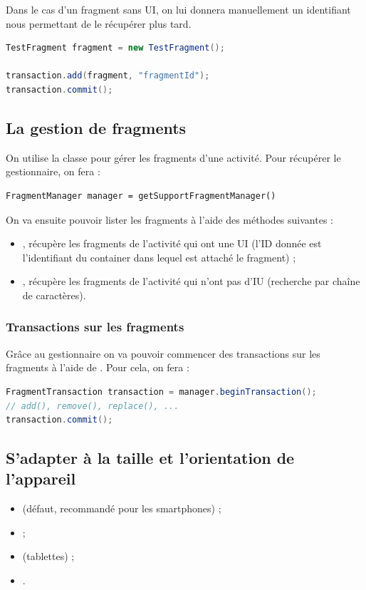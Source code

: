 Dans le cas d'un fragment sans UI, on lui donnera manuellement un identifiant nous permettant de le récupérer plus tard.
\begin{lstlisting}[language=java]
TestFragment fragment = new TestFragment();

transaction.add(fragment, "fragmentId");
transaction.commit();
\end{lstlisting}

\subsection{La gestion de fragments}
On utilise la classe  pour gérer les fragments d'une activité. Pour récupérer le gestionnaire, on fera :
\begin{lstlisting}
FragmentManager manager = getSupportFragmentManager()
\end{lstlisting}

On va ensuite pouvoir lister les fragments à l'aide des méthodes suivantes :
\begin{itemize}
    \item {}, récupère les fragments de l’activité qui ont une UI (l’ID donnée est l’identifiant du container dans lequel est attaché le fragment) ;
    \item {}, récupère les fragments de l’activité qui n’ont pas d’IU (recherche par chaîne de caractères).
\end{itemize}

\subsubsection{Transactions sur les fragments}
Grâce au gestionnaire  on va pouvoir commencer des transactions sur les fragments à l'aide de . Pour cela, on fera :

\begin{lstlisting}[language=java]
FragmentTransaction transaction = manager.beginTransaction();
// add(), remove(), replace(), ...
transaction.commit();
\end{lstlisting}

\subsection{S'adapter à la taille et l'orientation de l'appareil}
\begin{itemize}
    \item {} (défaut, recommandé pour les smartphones) ;
    \item {} ;
    \item {} (tablettes) ;
    \item {}.
\end{itemize}
